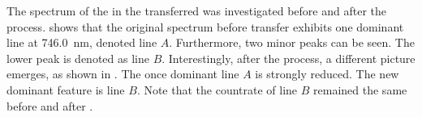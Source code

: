 	The spectrum of the \siv in the transferred \nd was investigated before and after the \pp process.  shows that the original spectrum before \nd transfer exhibits one dominant line at \SI{746.0}{nm}, denoted line $A$. Furthermore, two minor peaks can be seen. The lower \wl peak is denoted as line $B$. Interestingly, after the \pp process, a different picture emerges, as shown in . The once dominant line $A$ is strongly reduced. The new dominant feature is line $B$. Note that the countrate of line $B$ remained the same before and after \pp.


	\begin{figure}[!htb]
		\begin{subfigure}[t]{ 0.49\linewidth}
			\centering
			\caption{}
			\label{subfig::spectrum_diamond_for_vcsel_before_pp}
		\end{subfigure}
		\hfill
		\begin{subfigure}[t]{ 0.49\linewidth}
			\centering

\end{subfigure}
\end{figure}
